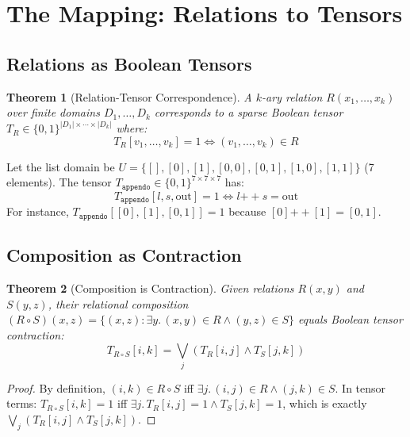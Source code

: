 \documentclass[11pt,a4paper]{article}
\newtheorem{theorem}{Theorem}
\begin{document}
\section{The Mapping: Relations to Tensors}
\label{sec:mapping_chirho}

\subsection{Relations as Boolean Tensors}

\begin{theorem}[Relation-Tensor Correspondence]
\label{thm:relation_tensor_chirho}
A $k$-ary relation $R(x_1, \ldots, x_k)$ over finite domains $D_1, \ldots, D_k$ corresponds
to a sparse Boolean tensor $T_R \in \{0,1\}^{|D_1| \times \cdots \times |D_k|}$ where:
\[
T_R[v_1, \ldots, v_k] = 1 \iff (v_1, \ldots, v_k) \in R
\]
\end{theorem}

\begin{example}
Let the list domain be $U = \{[], [0], [1], [0,0], [0,1], [1,0], [1,1]\}$ (7 elements).
The tensor $T_{\texttt{appendo}} \in \{0,1\}^{7 \times 7 \times 7}$ has:
\[
T_{\texttt{appendo}}[l, s, \text{out}] = 1 \iff l \mathbin{++} s = \text{out}
\]
For instance, $T_{\texttt{appendo}}[[0], [1], [0,1]] = 1$ because $[0] \mathbin{++} [1] = [0,1]$.
\end{example}

\subsection{Composition as Contraction}

\begin{theorem}[Composition is Contraction]
\label{thm:composition_chirho}
Given relations $R(x, y)$ and $S(y, z)$, their relational composition
$(R \circ S)(x, z) = \{(x, z) : \exists y.\, (x, y) \in R \land (y, z) \in S\}$
equals Boolean tensor contraction:
\[
T_{R \circ S}[i, k] = \bigvee_j (T_R[i, j] \land T_S[j, k])
\]
\end{theorem}

\begin{proof}
By definition, $(i, k) \in R \circ S$ iff $\exists j.\, (i, j) \in R \land (j, k) \in S$.
In tensor terms: $T_{R \circ S}[i,k] = 1$ iff $\exists j.\, T_R[i,j] = 1 \land T_S[j,k] = 1$,
which is exactly $\bigvee_j (T_R[i,j] \land T_S[j,k])$.
\end{proof}
\end{document}
